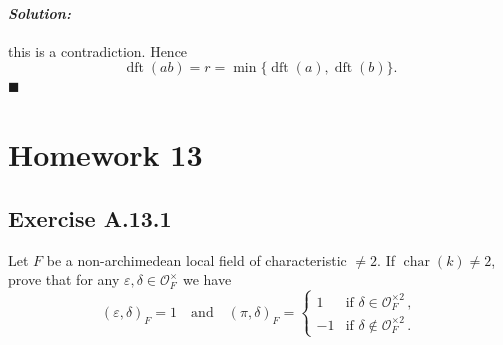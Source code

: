 \documentclass[12pt, a4paper]{article}
\newenvironment{solution}
  {\paragraph{\textit{Solution:}}\par\medskip}
  {\hfill$\blacksquare$\vspace{0.1cm}}
\begin{document}
\begin{solution}
this is a contradiction. Hence \[ \operatorname{dft}(ab)=r = \min\{\operatorname{dft}(a),\operatorname{dft}(b)\}. \]
\end{solution}
\section*{Homework 13}
\subsection*{Exercise A.13.1}
Let $F$ be a non-archimedean local field of characteristic $\neq 2$. If $\operatorname{char}(k) \neq 2$, prove that for any $\varepsilon, \delta \in \mathcal{O}_F^\times$ we have
\[ (\varepsilon, \delta)_F = 1 \quad \text{and} \quad (\pi, \delta)_F = \begin{cases} 1 & \text{if } \delta \in \mathcal{O}_F^{\times 2} \,, \\ -1 & \text{if } \delta \notin \mathcal{O}_F^{\times 2} \,. \end{cases} \]
\end{document}
